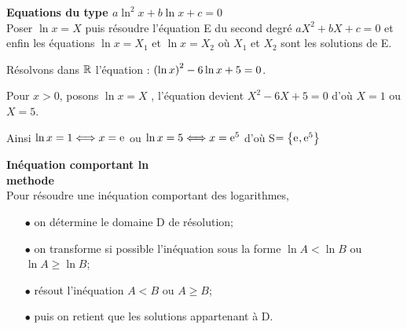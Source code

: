 \textbf{Equations du type $a\ln^{2} x+b\ln x+c=0$ }\\
Poser $ \ln x=X $ puis résoudre l'équation E du second degré $ aX^{2}+bX+c=0 $ et enfin les équations $ \ln x=X_{1} $  et $ \ln x=X_{2} $  où $ X_{1}$ et $X_{2} $  sont les solutions de E.
\begin{example} Résolvons dans $ \mathbb{R} $  l'équation  :\; $ \left(\ln x\right)^{2} -6\ln x+5=0 $. 

Pour $ x> 0 $, posons  $ \ln x=X $ ,\; l'équation  \; devient $ X^{2} -6X+5=0$ d'où $X=1 $ ou $X=5 $.

Ainsi  $ \ln x=1 \Longleftrightarrow x=\mathrm{e}^{}$  ou $ \ln x=5 \Longleftrightarrow x=\mathrm{e}^{5}$\; d'où S$ =\left\{\mathrm{e}^{},\mathrm{e}^{5}\right\} $
\end{example}
\textbf{Inéquation comportant ln}\\
\textbf{methode}\\
Pour résoudre une inéquation comportant des logarithmes,
\begin{itemize}
\item[$ \bullet$] on détermine le domaine D de résolution;
\item[$ \bullet$] on transforme si possible l'inéquation sous la forme $ \ln A<\ln B $  ou $ \ln A\geq\ln B $;
\item[$ \bullet$] résout l'inéquation $ A< B $  ou $ A\geq B $;
\item[$ \bullet$]  puis on retient que les solutions appartenant à D.
\end{itemize}

